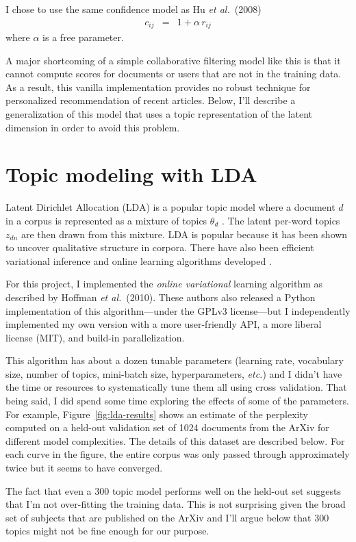 \documentclass[11pt]{article}
\newcommand{\fig}[1]{Figure~\ref{fig:#1}}
\newcommand{\etal}{\emph{et al.}}
\begin{document}
I chose to use the same confidence model as Hu \etal~(2008)
\begin{eqnarray}
c_{ij} &=& 1+\alpha\,r_{ij}
\end{eqnarray}
where $\alpha$ is a free parameter.

A major shortcoming of a simple collaborative filtering model like this is
that it cannot compute scores for documents or users that are not in the
training data.
As a result, this vanilla implementation provides no robust technique for
personalized recommendation of recent articles.
Below, I'll describe a generalization of this model that uses a topic
representation of the latent dimension in order to avoid this problem.

\section{Topic modeling with LDA}

Latent Dirichlet Allocation (LDA) is a popular topic model where a document
$d$ in a corpus is represented as a mixture of topics $\theta_d$ \cite{lda}.
The latent per-word topics $z_{dn}$ are then drawn from this mixture.
LDA is popular because it has been shown to uncover qualitative structure in
corpora.
There have also been efficient variational inference and online learning
algorithms developed \cite{ovlda}.

For this project, I implemented the \emph{online variational} learning
algorithm as described by Hoffman \etal~(2010).
These authors also released a Python implementation of this algorithm---under
the GPLv3 license---but I independently implemented my own version with a more
user-friendly API, a more liberal license (MIT), and build-in parallelization.

This algorithm has about a dozen tunable parameters (learning rate, vocabulary
size, number of topics, mini-batch size, hyperparameters, \emph{etc.}) and I
didn't have the time or resources to systematically tune them all using cross
validation.
That being said, I did spend some time exploring the effects of some of the
parameters.
For example, \fig{lda-results} shows an estimate of the perplexity computed on
a held-out validation set of 1024 documents from the ArXiv for different model
complexities.
The details of this dataset are described below.
For each curve in the figure, the entire corpus was only passed through
approximately twice but it seems to have converged.

The fact that even a 300 topic model performs well on the held-out set
suggests that I'm not over-fitting the training data.
This is not surprising given the broad set of subjects that are published on
the ArXiv and I'll argue below that 300 topics might not be fine enough for
our purpose.
\end{document}
